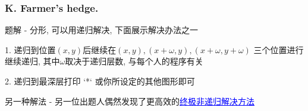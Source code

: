 \renewcommand{\problemname}{K. Farmer's hedge.}


\begin{frame}\frametitle{\problemname}
	
	\begin{block}{题解}
		- 分形, 可以用递归解决, 下面展示解决办法之一

		  1. 递归到位置$(x, y)$后继续在$(x, y), (x + \omega, y), (x + \omega, y + \omega)$ 三个位置进行继续递归, 其中$\omega$取决于递归层数, 与每个人的程序有关

		  2. 递归到最深层打印 `*` 或你所设定的其他图形即可

	\end{block}

	\begin{block}{另一种解法}
		- 另一位出题人偶然发现了更高效的\href{https://www.luogu.com.cn/blog/EntropyIncreaser/xie-er-bin-si-ji-san-jiao-xing-hu-wei-yun-suan}{\textcolor{blue}{\uline{终极非递归解决方法}}}

			

		        
	\end{block}
\end{frame}